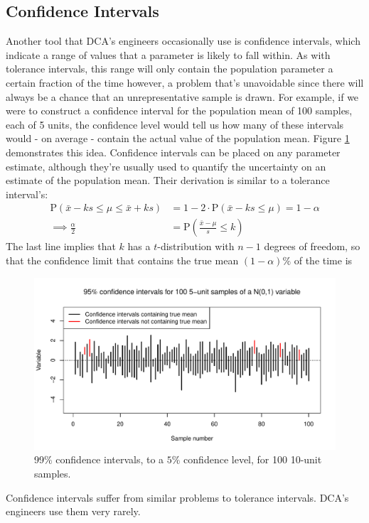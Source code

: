 \documentclass[11pt,a4paper,article]{memoir} %
\begin{document}
\subsection*{Confidence Intervals}
Another tool that DCA's engineers occasionally use is confidence intervals, which indicate a range of values that a parameter is likely to fall within. As with tolerance intervals, this range will only contain the population parameter a certain fraction of the time however, a problem that's unavoidable since there will always be a chance that an unrepresentative sample is drawn. For example, if we were to construct a confidence interval for the population mean of 100 samples, each of 5 units, the confidence level would tell us how many of these intervals would - on average - contain the actual value of the population mean. Figure \ref{fig:confidence_intervals} demonstrates this idea. Confidence intervals can be placed on any parameter estimate, although they're usually used to quantify the uncertainty on an estimate of the population mean. Their derivation is similar to a tolerance interval's:
\begin{align}
	\text{P}(\bar{x} - ks \leq \mu \leq \bar{x} + ks) &= 1 - 2\cdot \text{P}(\bar{x} - ks \leq \mu) = 1 - \alpha \nonumber\\
	\implies \frac{\alpha}{2} &= \text{P}(\frac{\bar{x} - \mu}{s} \leq k) 
\end{align}
The last line implies that $k$ has a $t$-distribution with $n - 1$ degrees of freedom, so that the confidence limit that contains the true mean $(1 - \alpha)\%$ of the time is
\begin{equation}
	[\bar{x} - t_{n-1}(\alpha)\cdot s, \ \bar{x} + t_{n-1}(\alpha)\cdot s]
\end{equation}
\begin{figure}[H]
\includegraphics[width=\textwidth]{confidence_intervals.pdf}
\caption{99$\%$ confidence intervals, to a $5\%$ confidence level, for 100 10-unit samples.}
\label{fig:confidence_intervals}
\end{figure}
Confidence intervals suffer from similar problems to tolerance intervals. DCA's engineers use them very rarely.
\end{document}
